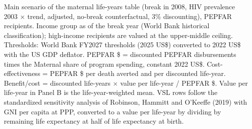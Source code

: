\begin{table}[htbp]
\begin{minipage}{\textwidth}\footnotesize Main scenario of the maternal life-years table (break in 2008, HIV prevalence 2003 $\times$ trend, adjusted, no-break counterfactual, 3\% discounting), PEPFAR recipients. Income group as of the break year (World Bank historical classification); high-income recipients are valued at the upper-middle ceiling. Thresholds: World Bank FY2027 thresholds (2025 US\$) converted to 2022 US\$ with the US GDP deflator. PEPFAR \$ = discounted PEPFAR disbursements times the Maternal share of program spending, constant 2022 US\$. Cost-effectiveness = PEPFAR \$ per death averted and per discounted life-year. Benefit/cost = discounted life-years $\times$ value per life-year / PEPFAR \$. Value per life-year in Panel B is the life-year-weighted mean. VSL rows follow the standardized sensitivity analysis of Robinson, Hammitt and O'Keeffe (2019) with GNI per capita at PPP, converted to a value per life-year by dividing by remaining life expectancy at half of life expectancy at birth.\end{minipage}
\end{table}
